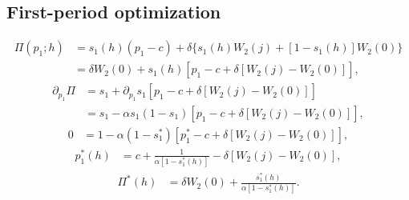 \documentclass[11pt]{article}
\begin{document}
\subsection{First-period optimization}
\begin{equation}
\begin{aligned}
\Pi(p_1;h)&=s_1(h)(p_1-c)+\delta\{s_1(h)W_2(j)+[1-s_1(h)]W_2(0)\}\\[3pt]
&=\delta W_2(0)+s_1(h)[p_1-c+\delta[W_2(j)-W_2(0)]],
\end{aligned}
\end{equation}
\begin{equation}
\begin{aligned}
\partial_{p_1}\Pi&=s_1+\partial_{p_1}s_1[p_1-c+\delta[W_2(j)-W_2(0)]]\\[3pt]
&=s_1-\alpha s_1(1-s_1)[p_1-c+\delta[W_2(j)-W_2(0)]],
\end{aligned}
\end{equation}
\begin{equation}
\begin{aligned}
0&=1-\alpha(1-s_1^*)[p_1^*-c+\delta[W_2(j)-W_2(0)]],
\end{aligned}
\end{equation}
\begin{equation}
\begin{aligned}
p_1^*(h)&=c+\frac1{\alpha[1-s_1^*(h)]}-\delta[W_2(j)-W_2(0)],
\end{aligned}
\end{equation}
\begin{equation}
\begin{aligned}
\Pi^*(h)&=\delta W_2(0)+\frac{s_1^*(h)}{\alpha[1-s_1^*(h)]}.
\end{aligned}
\end{equation}
\end{document}
